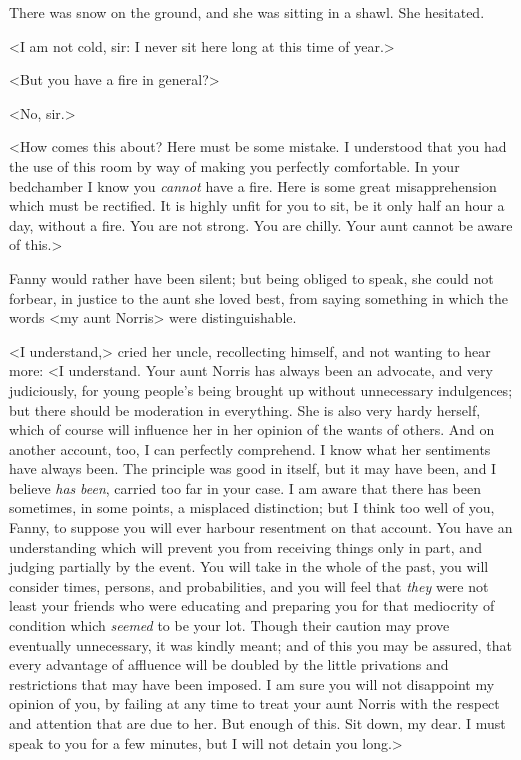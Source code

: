 There was snow on the ground, and she was sitting in a shawl. She hesitated.

<I am not cold, sir: I never sit here long at this time of year.>

<But you have a fire in general?>

<No, sir.>

<How comes this about? Here must be some mistake. I understood that you had the use of this room by way of making you perfectly comfortable. In your bedchamber I know you \textit{cannot}  have a fire. Here is some great misapprehension which must be rectified. It is highly unfit for you to sit, be it only half an hour a day, without a fire. You are not strong. You are chilly. Your aunt cannot be aware of this.>

Fanny would rather have been silent; but being obliged to speak, she could not forbear, in justice to the aunt she loved best, from saying something in which the words <my aunt Norris> were distinguishable.

<I understand,> cried her uncle, recollecting himself, and not wanting to hear more: <I understand. Your aunt Norris has always been an advocate, and very judiciously, for young people's being brought up without unnecessary indulgences; but there should be moderation in everything. She is also very hardy herself, which of course will influence her in her opinion of the wants of others. And on another account, too, I can perfectly comprehend. I know what her sentiments have always been. The principle was good in itself, but it may have been, and I believe \textit{has}  \textit{been}, carried too far in your case. I am aware that there has been sometimes, in some points, a misplaced distinction; but I think too well of you, Fanny, to suppose you will ever harbour resentment on that account. You have an understanding which will prevent you from receiving things only in part, and judging partially by the event. You will take in the whole of the past, you will consider times, persons, and probabilities, and you will feel that \textit{they}  were not least your friends who were educating and preparing you for that mediocrity of condition which \textit{seemed}  to be your lot. Though their caution may prove eventually unnecessary, it was kindly meant; and of this you may be assured, that every advantage of affluence will be doubled by the little privations and restrictions that may have been imposed. I am sure you will not disappoint my opinion of you, by failing at any time to treat your aunt Norris with the respect and attention that are due to her. But enough of this. Sit down, my dear. I must speak to you for a few minutes, but I will not detain you long.>

